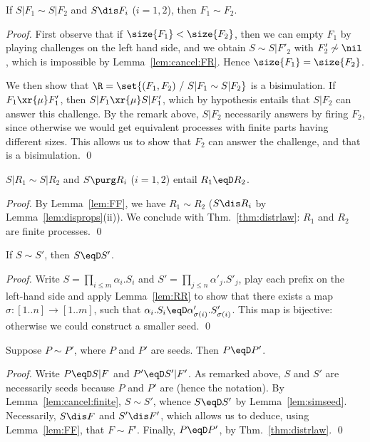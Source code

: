 \documentclass{llncs}
\begin{document}
\begin{lem}\label{lem:FF}
  If $S|F_1\sim S|F_2$ and $S\dis F_i$ ($i=1,2$), then $F_1\sim F_2$.
\end{lem}
\begin{proof}
  First observe that if $\size{F_1}<\size{F_2}$, then we can empty
  $F_1$ by playing challenges on the left hand side, and we obtain
  $S\sim S|F'_2$ with $F'_2\not\sim\nil$, which is impossible by
  Lemma~\ref{lem:cancel:FR}. Hence $\size{F_1}=\size{F_2}$.
  
  We then show that $\R = \set{(F_1,F_2)~/~ S|F_1\sim S|F_2}$ is a
  bisimulation. If $F_1\xr{\mu}F'_1$, then $S|F_1\xr{\mu}S|F'_1$,
  which by hypothesis entails that $S|F_2$ can answer this challenge.
  By the remark above, $S|F_2$ necessarily answers by firing $F_2$,
  since otherwise we would get equivalent processes with finite parts
  having different sizes. This allows us to show that $F_2$ can
  answer the challenge, and that \R{} is a bisimulation.
  \qed
\end{proof}

\begin{lem}\label{lem:RR}
  $S|R_1\sim S|R_2$ and $S\purg R_i$ ($i=1,2$) entail $R_1\eqD R_2$.
\end{lem}
\begin{proof}
  By Lemma~\ref{lem:FF}, we have $R_1\sim R_2$ ($S\dis R_i$ by
  Lemma~\ref{lem:disprops}(ii)).  We conclude with
  Thm.~\ref{thm:distrlaw}: $R_1$ and $R_2$ are finite processes.  \qed
\end{proof}

\begin{lem}\label{lem:simseed}
  If $S\sim S'$, then $S\eqD S'$.
\end{lem}
\begin{proof}
  Write $S = \prod_{i\leq m} \!\alpha_i.S_i$ and $S' = \prod_{j\leq n}
  \!\alpha'_j.S'_j$, play each prefix on the left-hand side and apply
  Lemma~\ref{lem:RR} to show that there exists a map $\sigma:
  [1..n]\to{}[1..m]$, such that
  $\alpha_i.S_i\eqD\alpha'_{\sigma(i)}.S'_{\sigma(i)}$. This map is
  bijective: otherwise we could construct a smaller seed.
\qed
\end{proof}

\begin{prop}\label{prop:compare:seeds}
  Suppose $P\sim P'$, where $P$ and $P'$ are seeds. Then $P\eqD P'$.
\end{prop}
\begin{proof}
  Write $P \eqD S | F$ and $P' \eqD S' | F'$. As remarked above, $S$
  and $S'$ are necessarily seeds because $P$ and $P'$ are (hence the
  notation). By Lemma~\ref{lem:cancel:finite}, $S\sim S'$, whence
  $S\eqD S'$ by Lemma~\ref{lem:simseed}.
Necessarily, $S\dis F$ and $S'\dis F'$, which allows us to deduce,
  using Lemma~\ref{lem:FF}, that $F\sim F'$. Finally, $P\eqD P'$, by
  Thm.~\ref{thm:distrlaw}.
\qed
\end{proof}
\end{document}
